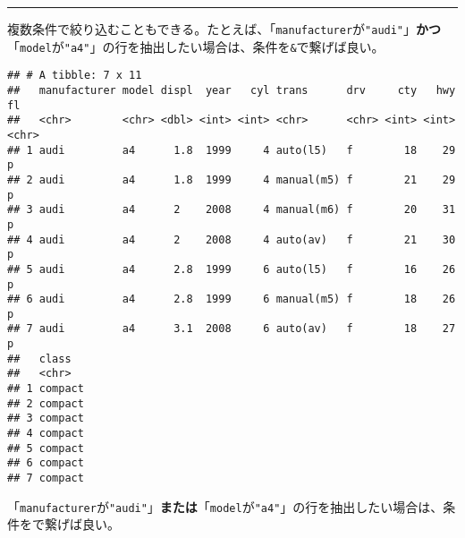 \documentclass[]{book}
\newenvironment{Shaded}{\begin{snugshade}}{\end{snugshade}}
\newcommand{\KeywordTok}[1]{\textcolor[rgb]{0.13,0.29,0.53}{\textbf{#1}}}
\newcommand{\StringTok}[1]{\textcolor[rgb]{0.31,0.60,0.02}{#1}}
\newcommand{\OperatorTok}[1]{\textcolor[rgb]{0.81,0.36,0.00}{\textbf{#1}}}
\newcommand{\NormalTok}[1]{#1}
\begin{document}
\begin{center}\rule{0.5\linewidth}{\linethickness}\end{center}

複数条件で絞り込むこともできる。たとえば、「\texttt{manufacturer}が\texttt{"audi"}」\textbf{かつ}「\texttt{model}が\texttt{"a4"}」の行を抽出したい場合は、条件を\texttt{\&}で繋げば良い。

\begin{Shaded}
\end{Shaded}

\begin{verbatim}
## # A tibble: 7 x 11
##   manufacturer model displ  year   cyl trans      drv     cty   hwy fl   
##   <chr>        <chr> <dbl> <int> <int> <chr>      <chr> <int> <int> <chr>
## 1 audi         a4      1.8  1999     4 auto(l5)   f        18    29 p    
## 2 audi         a4      1.8  1999     4 manual(m5) f        21    29 p    
## 3 audi         a4      2    2008     4 manual(m6) f        20    31 p    
## 4 audi         a4      2    2008     4 auto(av)   f        21    30 p    
## 5 audi         a4      2.8  1999     6 auto(l5)   f        16    26 p    
## 6 audi         a4      2.8  1999     6 manual(m5) f        18    26 p    
## 7 audi         a4      3.1  2008     6 auto(av)   f        18    27 p    
##   class  
##   <chr>  
## 1 compact
## 2 compact
## 3 compact
## 4 compact
## 5 compact
## 6 compact
## 7 compact
\end{verbatim}

「\texttt{manufacturer}が\texttt{"audi"}」\textbf{または}「\texttt{model}が\texttt{"a4"}」の行を抽出したい場合は、条件を\texttt{\textbar{}}で繋げば良い。

\begin{Shaded}
\end{Shaded}
\end{document}
